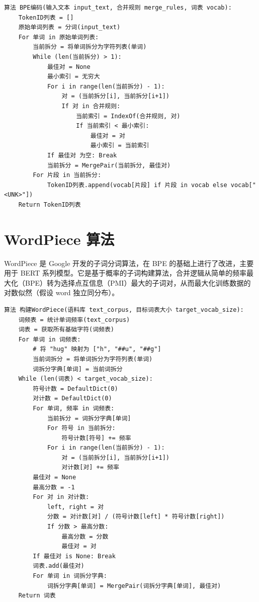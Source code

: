\documentclass[11pt, a4paper]{article}
\begin{document}
\begin{lstlisting}[caption={BPE 编码算法}]
算法 BPE编码(输入文本 input_text, 合并规则 merge_rules, 词表 vocab):
    TokenID列表 = []
    原始单词列表 = 分词(input_text)
    For 单词 in 原始单词列表:
        当前拆分 = 将单词拆分为字符列表(单词)
        While (len(当前拆分) > 1):
            最佳对 = None
            最小索引 = 无穷大
            For i in range(len(当前拆分) - 1):
                对 = (当前拆分[i], 当前拆分[i+1])
                If 对 in 合并规则:
                    当前索引 = IndexOf(合并规则, 对)
                    If 当前索引 < 最小索引:
                        最佳对 = 对
                        最小索引 = 当前索引
            If 最佳对 为空: Break
            当前拆分 = MergePair(当前拆分, 最佳对)
        For 片段 in 当前拆分:
            TokenID列表.append(vocab[片段] if 片段 in vocab else vocab["<UNK>"])
    Return TokenID列表
\end{lstlisting}

\section{WordPiece 算法}

WordPiece 是 Google 开发的子词分词算法，在 BPE 的基础上进行了改进，主要用于 BERT 系列模型。它是基于概率的子词构建算法，合并逻辑从简单的频率最大化（BPE）转为选择点互信息（PMI）最大的子词对，从而最大化训练数据的对数似然（假设 word 独立同分布）。

\begin{lstlisting}[caption={构建 WordPiece}]
算法 构建WordPiece(语料库 text_corpus, 目标词表大小 target_vocab_size):
    词频表 = 统计单词频率(text_corpus)
    词表 = 获取所有基础字符(词频表) 
    For 单词 in 词频表:
        # 将 "hug" 映射为 ["h", "##u", "##g"]
        当前词拆分 = 将单词拆分为字符列表(单词)
        词拆分字典[单词] = 当前词拆分
    While (len(词表) < target_vocab_size):
        符号计数 = DefaultDict(0)
        对计数 = DefaultDict(0)
        For 单词, 频率 in 词频表:
            当前拆分 = 词拆分字典[单词]
            For 符号 in 当前拆分:
                符号计数[符号] += 频率
            For i in range(len(当前拆分) - 1):
                对 = (当前拆分[i], 当前拆分[i+1])
                对计数[对] += 频率
        最佳对 = None
        最高分数 = -1
        For 对 in 对计数:
            left, right = 对
            分数 = 对计数[对] / (符号计数[left] * 符号计数[right])
            If 分数 > 最高分数:
                最高分数 = 分数
                最佳对 = 对
        If 最佳对 is None: Break
        词表.add(最佳对)
        For 单词 in 词拆分字典:
            词拆分字典[单词] = MergePair(词拆分字典[单词], 最佳对)
    Return 词表
\end{lstlisting}
\end{document}
